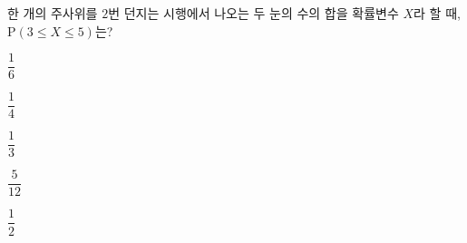 한 개의 주사위를 $2$번 던지는 시행에서 나오는 두 눈의 수의 합을 확률변수 $X$라 할 때, $\mathrm{P}(3\le X\le 5)$는?
\begin{choices32}{\rule[-3ex]{0pt}{8ex}$\dfrac{1}{6}$}{\rule[-3ex]{0pt}{8ex}$\dfrac{1}{4}$}{\rule[-3ex]{0pt}{8ex}$\dfrac{1}{3}$}{\rule[-3ex]{0pt}{8ex}$\dfrac{5}{12}$}{\rule[-3ex]{0pt}{8ex}$\dfrac{1}{2}$}\end{choices32}
